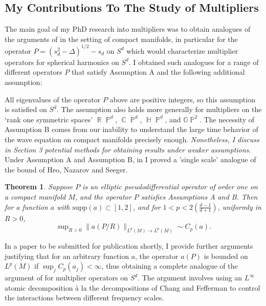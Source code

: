 \documentclass[11pt]{article}
\newtheorem*{theorem}{Theorem}
\DeclareMathOperator{\RR}{\mathbb{R}}
\DeclareMathOperator{\HH}{\mathbb{H}}
\DeclareMathOperator{\CC}{\mathbb{C}}
\DeclareMathOperator{\PP}{\mathbb{P}}
\begin{document}
\subsection{My Contributions To The Study of Multipliers} \label{ContributionMultipliers}

The main goal of my PhD research into multipliers was to obtain analogues of the arguments of \cite{HeoNazarovSeeger,Cladek,KimQuasiradial} in the setting of compact manifolds, in particular for the operator $P = (s_d^2 - \Delta)^{1/2} - s_d$ on $S^d$ which would characterize multiplier operators for spherical harmonics on $S^d$. I obtained such analogues for a range of different operators $P$ that satisfy Assumption A and the following additional assumption:
%
\begin{center}
\end{center}
%
All eigenvalues of the operator $P$ above are positive integers, so this assumption is satisfied on $S^d$. The assumption also holds more generally for multipliers on the `rank one symmetric spaces' $\RR \PP^d$, $\CC \PP^d$, $\HH \PP^d$, and $\mathbb{O} \PP^2$. The necessity of Assumption B comes from our inability to understand the large time behavior of the wave equation on compact manifolds precisely enough. \emph{Nonetheless, I discuss in Section 3 potential methods for obtaining results under weaker assumptions}. Under Assumption A and Assumption B, in \cite{DensonCharacterization} I proved a 'single scale' analogue of the bound of Heo, Nazarov and Seeger.

\begin{theorem} \cite{DensonCharacterization}
	Suppose $P$ is an elliptic pseudodifferential operator of order one on a compact manifold $M$, and the operator $P$ satisfies Assumptions A and B. Then for a function $a$ with $\text{supp}(a) \subset [1,2]$, and for $1 < p < 2 ({\scriptstyle \frac{d-1}{d+1}})$, uniformly in $R > 0$,
    \[ \sup\nolimits_{R > 0} \| a(P/R) \|_{L^p(M) \to L^p(M)} \sim C_p(a). \]
\end{theorem}

In a paper to be submitted for publication shortly, I provide further arguments justifying that for an arbitrary function $a$, the operator $a(P)$ is bounded on $L^p(M)$ if $\sup_j C_p(a_j) < \infty$, thus obtaining a complete analogue of the argument of \cite{HeoNazarovSeeger} for multiplier operators on $S^d$. The argument involves using an $L^\infty$ atomic decomposition à la the decompositions of Chang and Fefferman \cite{ChangFefferman} to control the interactions between different frequency scales. %
\end{document}
